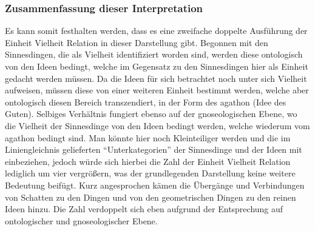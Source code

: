 \subsubsection*{Zusammenfassung dieser Interpretation}
Es kann somit festhalten werden, dass es eine zweifache doppelte Ausführung der Einheit Vielheit Relation in dieser Darstellung gibt. Begonnen mit den Sinnesdingen, die als Vielheit identifiziert worden sind, werden diese ontologisch von den Ideen bedingt, welche im Gegensatz zu den Sinnesdingen hier als Einheit gedacht werden müssen. Da die Ideen für sich betrachtet noch unter sich Vielheit aufweisen, müssen diese von einer weiteren Einheit bestimmt werden, welche aber ontologisch diesen Bereich transzendiert, in der Form des agathon (Idee des Guten). Selbiges Verhältnis fungiert ebenso auf der gnoseologischen Ebene, wo die Vielheit der Sinnesdinge von den Ideen bedingt werden, welche wiederum vom agathon bedingt sind. Man könnte hier noch Kleinteiliger werden und die im Liniengleichnis gelieferten \enquote{Unterkategorien} der Sinnesdinge und der Ideen mit einbeziehen, jedoch würde sich hierbei die Zahl der Einheit Vielheit Relation lediglich um vier vergrößern, was der grundlegenden Darstellung keine weitere Bedeutung beifügt. Kurz angesprochen kämen die Übergänge und Verbindungen von Schatten zu den Dingen und von den geometrischen Dingen zu den reinen Ideen hinzu. Die Zahl verdoppelt sich eben aufgrund der Entsprechung auf ontologischer und gnoseologischer Ebene.\\
